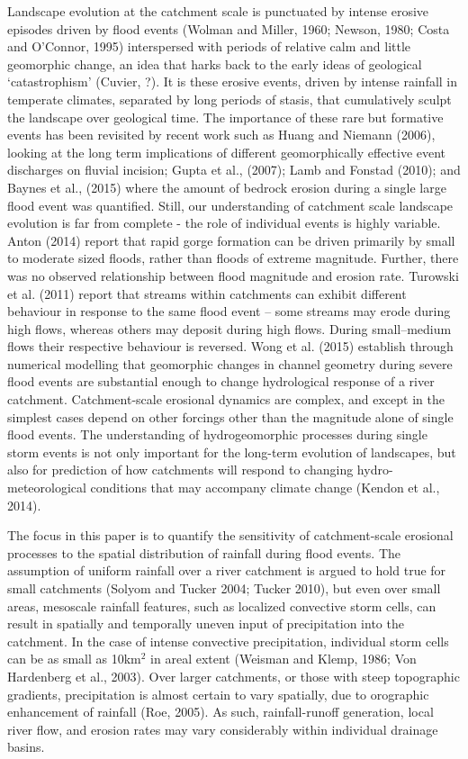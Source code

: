 Landscape evolution at the catchment scale is punctuated by intense erosive episodes driven by flood events (Wolman and Miller, 1960; Newson, 1980; Costa and O'Connor, 1995) interspersed with periods of relative calm and little geomorphic change, an idea that harks back to the early ideas of geological `catastrophism' (Cuvier, ?). It is these erosive events, driven by intense rainfall in temperate climates, separated by long periods of stasis, that cumulatively sculpt the landscape over geological time. The importance of these rare but formative events has been revisited by recent work such as Huang and Niemann (2006), looking at the long term implications of different geomorphically effective event discharges on fluvial incision; Gupta et al., (2007); Lamb and Fonstad (2010); and Baynes et al., (2015) where the amount of bedrock erosion during a single large flood event was quantified. Still, our understanding of catchment scale landscape evolution is far from complete - the role of individual events is highly variable. Anton (2014) report that rapid gorge formation can be driven primarily by small to moderate sized floods, rather than floods of extreme magnitude. Further, there was no observed relationship between flood magnitude and erosion rate. Turowski et al. (2011) report that streams within catchments can exhibit different behaviour in response to the same flood event -- some streams may erode during high flows, whereas others may deposit during high flows. During small--medium flows their respective behaviour is reversed. Wong et al. (2015) establish through numerical modelling that geomorphic changes in channel geometry during severe flood events are substantial enough to change hydrological response of a river catchment. Catchment-scale erosional dynamics are complex, and except in the simplest cases depend on other forcings other than the magnitude alone of single flood events.  The understanding of hydrogeomorphic processes during single storm events is not only important for the long-term evolution of landscapes, but also for prediction of how catchments will respond to changing hydro-meteorological conditions that may accompany climate change (Kendon et al., 2014).

The focus in this paper is to quantify the sensitivity of catchment-scale erosional processes to the spatial distribution of rainfall during flood events. The assumption of uniform rainfall over a river catchment is argued to hold true for small catchments (Solyom and Tucker 2004; Tucker 2010), but even over small areas, mesoscale rainfall features, such as localized convective storm cells, can result in spatially and temporally uneven input of precipitation into the catchment. In the case of intense convective precipitation, individual storm cells can be as small as 10km$^2$ in areal extent (Weisman and Klemp, 1986; Von Hardenberg et al., 2003). Over larger catchments, or those with steep topographic gradients, precipitation is almost certain to vary spatially, due to orographic enhancement of rainfall (Roe, 2005). As such, rainfall-runoff generation, local river flow, and erosion rates may vary considerably within individual drainage basins. 


